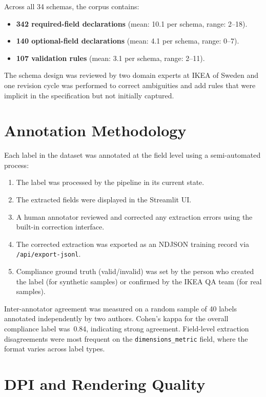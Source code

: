 Across all 34 schemas, the corpus contains:
\begin{itemize}
  \item \textbf{342 required-field declarations} (mean: 10.1 per schema, range: 2--18).
  \item \textbf{140 optional-field declarations} (mean: 4.1 per schema, range: 0--7).
  \item \textbf{107 validation rules} (mean: 3.1 per schema, range: 2--11).
\end{itemize}

The schema design was reviewed by two domain experts at IKEA of Sweden and one revision
cycle was performed to correct ambiguities and add rules that were implicit in the
specification but not initially captured.

\section{Annotation Methodology}

Each label in the dataset was annotated at the field level using a semi-automated process:

\begin{enumerate}
  \item The label was processed by the pipeline in its current state.
  \item The extracted fields were displayed in the Streamlit \ac{UI}.
  \item A human annotator reviewed and corrected any extraction errors using the
  built-in correction interface.
  \item The corrected extraction was exported as an NDJSON training record via
  \texttt{/api/export-jsonl}.
  \item Compliance ground truth (valid/invalid) was set by the person who created the
  label (for synthetic samples) or confirmed by the IKEA \ac{QA} team (for real samples).
\end{enumerate}

Inter-annotator agreement was measured on a random sample of 40 labels annotated
independently by two authors. Cohen's kappa for the overall compliance label was~0.84,
indicating strong agreement. Field-level extraction disagreements were most frequent on the
\texttt{dimensions\_metric} field, where the format varies across label types.

\section{DPI and Rendering Quality}

